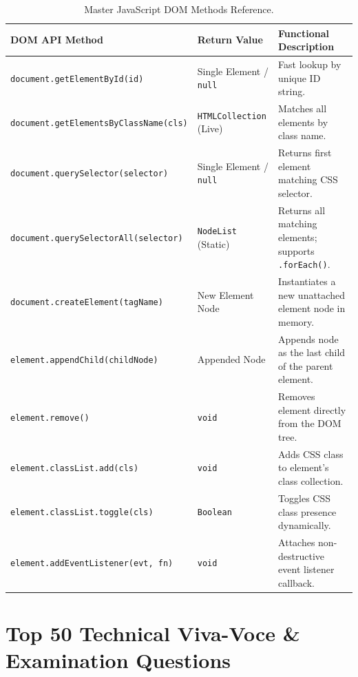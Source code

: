\begin{table}[htbp]
\centering
\small
\renewcommand{\arraystretch}{1.2}
\begin{tabularx}{\linewidth}{ll>{\raggedright\arraybackslash}X}
\toprule
\textbf{DOM API Method} & \textbf{Return Value} & \textbf{Functional Description} \\
\midrule
\texttt{document.getElementById(id)} & Single Element / \texttt{null} & Fast lookup by unique ID string. \\
\texttt{document.getElementsByClassName(cls)} & \texttt{HTMLCollection} (Live) & Matches all elements by class name. \\
\texttt{document.querySelector(selector)} & Single Element / \texttt{null} & Returns first element matching CSS selector. \\
\texttt{document.querySelectorAll(selector)} & \texttt{NodeList} (Static) & Returns all matching elements; supports \texttt{.forEach()}. \\
\texttt{document.createElement(tagName)} & New Element Node & Instantiates a new unattached element node in memory. \\
\texttt{element.appendChild(childNode)} & Appended Node & Appends node as the last child of the parent element. \\
\texttt{element.remove()} & \texttt{void} & Removes element directly from the DOM tree. \\
\texttt{element.classList.add(cls)} & \texttt{void} & Adds CSS class to element's class collection. \\
\texttt{element.classList.toggle(cls)} & \texttt{Boolean} & Toggles CSS class presence dynamically. \\
\texttt{element.addEventListener(evt, fn)} & \texttt{void} & Attaches non-destructive event listener callback. \\
\bottomrule
\end{tabularx}
\caption{Master JavaScript DOM Methods Reference.}
\label{tab:master-dom-methods}
\end{table}

\section{Top 50 Technical Viva-Voce \& Examination Questions}

